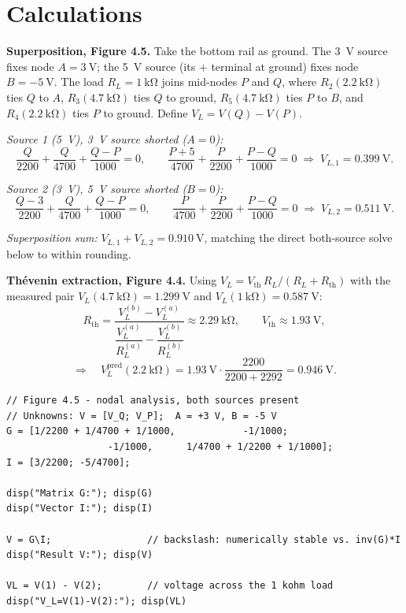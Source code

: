 \documentclass[11pt]{article}
\begin{document}
\section*{Calculations}

\textbf{Superposition, Figure 4.5.} Take the bottom rail as ground. The
\SI{3}{\volt} source fixes node $A=\SI{+3}{\volt}$; the \SI{5}{\volt} source
(its $+$ terminal at ground) fixes node $B=\SI{-5}{\volt}$. The load
$R_L=\SI{1}{\kilo\ohm}$ joins mid-nodes $P$ and $Q$, where $R_2(\SI{2.2}{\kilo\ohm})$
ties $Q$ to $A$, $R_3(\SI{4.7}{\kilo\ohm})$ ties $Q$ to ground,
$R_5(\SI{4.7}{\kilo\ohm})$ ties $P$ to $B$, and $R_4(\SI{2.2}{\kilo\ohm})$ ties
$P$ to ground. Define $V_L=V(Q)-V(P)$.

\emph{Source 1 (\SI{5}{\volt}), \SI{3}{\volt} source shorted ($A=0$):}
\[
\frac{Q}{2200}+\frac{Q}{4700}+\frac{Q-P}{1000}=0,\qquad
\frac{P+5}{4700}+\frac{P}{2200}+\frac{P-Q}{1000}=0
\;\Rightarrow\; V_{L,1}=\SI{+0.399}{\volt}.
\]

\emph{Source 2 (\SI{3}{\volt}), \SI{5}{\volt} source shorted ($B=0$):}
\[
\frac{Q-3}{2200}+\frac{Q}{4700}+\frac{Q-P}{1000}=0,\qquad
\frac{P}{4700}+\frac{P}{2200}+\frac{P-Q}{1000}=0
\;\Rightarrow\; V_{L,2}=\SI{+0.511}{\volt}.
\]

\emph{Superposition sum:} $V_{L,1}+V_{L,2}=\SI{0.910}{\volt}$, matching the direct
both-source solve below to within rounding.

\textbf{Th\'evenin extraction, Figure 4.4.} Using
$V_L=V_{\text{th}}\,R_L/(R_L+R_{\text{th}})$ with the measured pair
$V_L(\SI{4.7}{\kilo\ohm})=\SI{1.299}{\volt}$ and
$V_L(\SI{1}{\kilo\ohm})=\SI{0.587}{\volt}$:
\[
R_{\text{th}}=\frac{V_L^{(b)}-V_L^{(a)}}
{\dfrac{V_L^{(a)}}{R_L^{(a)}}-\dfrac{V_L^{(b)}}{R_L^{(b)}}}\approx\SI{2.29}{\kilo\ohm},
\qquad V_{\text{th}}\approx\SI{1.93}{\volt},
\]
\[
\Rightarrow\quad V_L^{\text{pred}}(\SI{2.2}{\kilo\ohm})
=\SI{1.93}{\volt}\cdot\frac{2200}{2200+2292}=\SI{0.946}{\volt}.
\]

\begin{lstlisting}[style=scilab, caption={SciLab nodal solve, Figure 4.5 (both sources present).}]
// Figure 4.5 - nodal analysis, both sources present
// Unknowns: V = [V_Q; V_P];  A = +3 V, B = -5 V
G = [1/2200 + 1/4700 + 1/1000,            -1/1000;
                  -1/1000,      1/4700 + 1/2200 + 1/1000];
I = [3/2200; -5/4700];

disp("Matrix G:"); disp(G)
disp("Vector I:"); disp(I)

V = G\I;                 // backslash: numerically stable vs. inv(G)*I
disp("Result V:"); disp(V)

VL = V(1) - V(2);        // voltage across the 1 kohm load
disp("V_L=V(1)-V(2):"); disp(VL)
\end{lstlisting}
\end{document}
